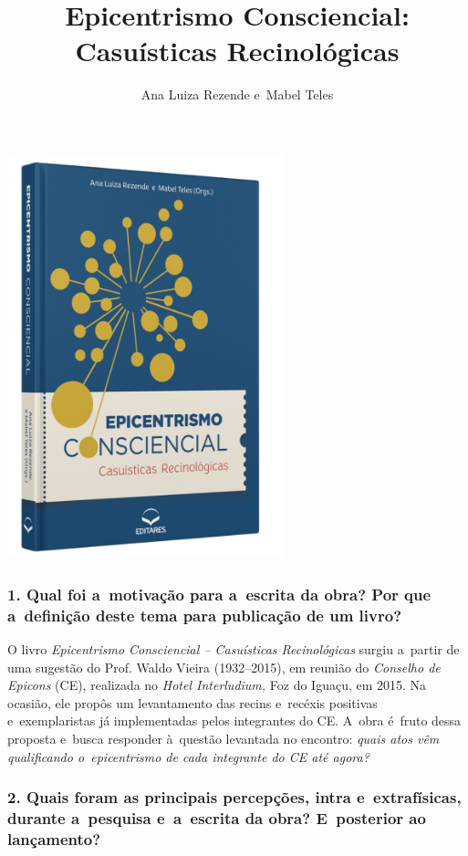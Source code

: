\documentclass{gescons}
\author{Ana Luiza Rezende e~Mabel Teles}
\title{Epicentrismo Consciencial: Casuísticas Recinológicas}
\begin{document}
    \makeentrevistatitle

    \begin{multicols}{2}


\begin{center}
    \includegraphics[width=8cm]{articles/entrevista/mockups/Mabel-e-Ana-Luiza}
\end{center}

\subsubsection{1. Qual foi a~motivação para a~escrita da obra? Por que a~definição deste tema para publicação de um livro?}


O livro \textit{Epicentrismo Consciencial – Casuísticas Recinológicas} surgiu a~partir de uma sugestão do Prof. Waldo Vieira (1932--2015), em reunião do \textit{Conselho de Epicons} (CE), realizada no \textit{Hotel Interludium,} Foz do Iguaçu, em 2015. Na ocasião, ele propôs um levantamento das recins e~recéxis positivas e~exemplaristas já implementadas pelos integrantes do CE. A~obra é~fruto dessa proposta e~busca responder à~questão levantada no encontro: \textit{quais atos vêm qualificando o~epicentrismo de cada integrante do CE até agora? }

\subsubsection{2. Quais foram as principais percepções, intra e~extrafísicas, durante a~pesquisa e~a~escrita da obra? E~posterior ao lançamento?}


\end{multicols}
\end{document}
